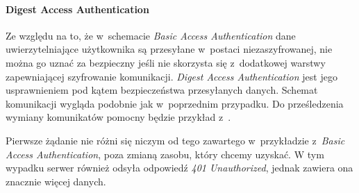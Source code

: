 \documentclass[11pt]{aghdpl}
\begin{document}
\paragraph{Digest Access Authentication}

Ze względu na to, że w~schemacie \emph{Basic Access Authentication} dane uwierzytelniające użytkownika są przesyłane w~postaci niezaszyfrowanej, nie można go uznać za bezpieczny jeśli nie skorzysta się z~dodatkowej warstwy zapewniającej szyfrowanie komunikacji. \emph{Digest Access Authentication} jest jego usprawnieniem pod kątem bezpieczeństwa przesyłanych danych. Schemat komunikacji wygląda podobnie jak w~poprzednim przypadku. Do prześledzenia wymiany komunikatów pomocny będzie przykład z~\cite{BDA99}.

Pierwsze żądanie nie różni się niczym od tego zawartego w~przykładzie z~\emph{Basic Access Authentication}, poza zmianą zasobu, który chcemy uzyskać. W tym wypadku serwer również odsyła odpowiedź \emph{401 Unauthorized}, jednak zawiera ona znacznie więcej danych.
\end{document}
